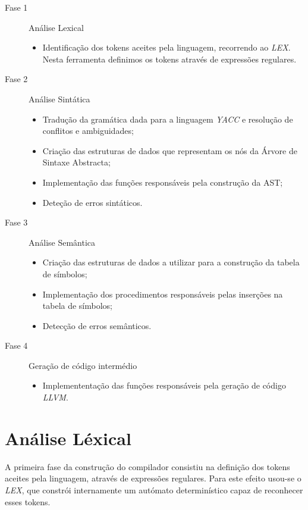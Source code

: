 \documentclass[11pt,a4paper]{article}
\begin{document}
\begin{description}
	\item[Fase 1] Análise Lexical
		\begin{itemize}
			\item Identificação dos tokens aceites pela linguagem, recorrendo ao \textit{LEX}. Nesta ferramenta definimos os tokens através de expressões regulares. 
		\end{itemize}
	\item[Fase 2] Análise Sintática
		\begin{itemize}
			\item Tradução da gramática dada para a linguagem \textit{YACC} e resolução de conflitos e ambiguidades;
			\item Criação das estruturas de dados que representam os nós da Árvore de Sintaxe Abstracta;
			\item Implementação das funções responsáveis pela construção da AST;
			\item Deteção de erros sintáticos.
		\end{itemize}
	\item[Fase 3] Análise Semântica
		\begin{itemize}
			\item Criação das estruturas de dados a utilizar para a construção da tabela de símbolos;
			\item Implementação dos procedimentos responsáveis pelas inserções na tabela de símbolos;
			\item Detecção de erros semânticos.
		\end{itemize}
	\item[Fase 4] Geração de código intermédio
		\begin{itemize}
			\item Implemententação das funções responsáveis pela geração de código \textit{LLVM}.
		\end{itemize}
\end{description}

\newpage

\section{Análise Léxical}

A primeira fase da construção do compilador consistiu na definição dos tokens aceites pela linguagem, através de expressões regulares. Para este efeito usou-se o \textit{LEX}, que constrói internamente um autómato determinístico capaz de reconhecer esses tokens.
\end{document}
